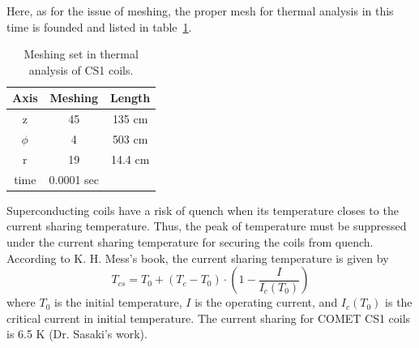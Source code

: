 Here, as for the issue of meshing, the proper mesh for thermal analysis in this time is founded and listed in table~\ref{4mesh}.
 \begin{table}[H]
  \centering
  \begin{tabular}{ccc} \hline \hline
   Axis & Meshing & Length \\ \hline
   z & 45 & 135 cm \\
   $\phi$ & 4 & 503 cm \\
   r & 19 & 14.4 cm \\
   time & 0.0001 sec & \\ \hline \hline
  \end{tabular}
  \caption{Meshing set in thermal analysis of CS1 coils.}
  \label{4mesh}
 \end{table}
Superconducting coils have a risk of quench when its temperature closes to the current sharing temperature.
Thus, the peak of temperature must be suppressed under the current sharing temperature for securing the coils from quench.
According to K. H. Mess's book, the current sharing temperature is given by
\begin{equation}
 T_{cs} = T_0 + (T_c - T_0)\cdot (1 - \frac{I}{I_c(T_0)})
\end{equation}
where $T_0$ is the initial temperature, $I$ is the operating current, and $I_c(T_0)$ is the critical current in initial temperature.
The current sharing for COMET CS1 coils is 6.5 K (Dr. Sasaki's work).
